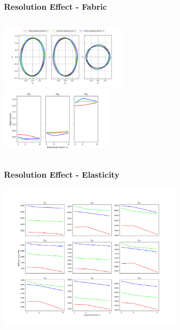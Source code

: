 \documentclass[xcolor=table,11pt]{beamer}
\begin{document}
	\begin{frame}
		\frametitle{Resolution Effect - Fabric}

		\begin{columns}
			\includegraphics[height=3.25cm]{02_ResolutionEffect/Results/Fabric}\\

			\includegraphics[height=3.25cm]{02_ResolutionEffect/Results/eValues}\\
		\end{columns}

	\end{frame}

	\begin{frame}
		\frametitle{Resolution Effect - Elasticity}
		\centering
		\includegraphics[height=7.5cm, trim=0 0 0 20]{02_ResolutionEffect/Results/Stiffness}\\
	\end{frame}
\end{document}
